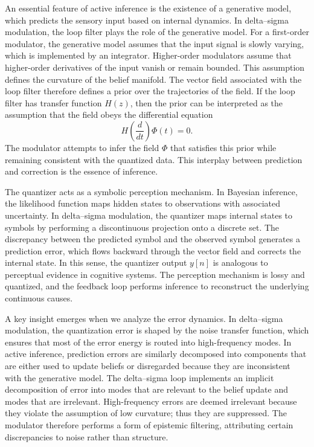 An essential feature of active inference is the existence of a generative model, which predicts the sensory input based on internal dynamics. In delta–sigma modulation, the loop filter plays the role of the generative model. For a first-order modulator, the generative model assumes that the input signal is slowly varying, which is implemented by an integrator. Higher-order modulators assume that higher-order derivatives of the input vanish or remain bounded. This assumption defines the curvature of the belief manifold. The vector field associated with the loop filter therefore defines a prior over the trajectories of the field. If the loop filter has transfer function \(H(z)\), then the prior can be interpreted as the assumption that the field obeys the differential equation
\[
H\left(\frac{d}{dt}\right)\Phi(t) = 0.
\]
The modulator attempts to infer the field \(\Phi\) that satisfies this prior while remaining consistent with the quantized data. This interplay between prediction and correction is the essence of inference.

The quantizer acts as a symbolic perception mechanism. In Bayesian inference, the likelihood function maps hidden states to observations with associated uncertainty. In delta–sigma modulation, the quantizer maps internal states to symbols by performing a discontinuous projection onto a discrete set. The discrepancy between the predicted symbol and the observed symbol generates a prediction error, which flows backward through the vector field and corrects the internal state. In this sense, the quantizer output \(y[n]\) is analogous to perceptual evidence in cognitive systems. The perception mechanism is lossy and quantized, and the feedback loop performs inference to reconstruct the underlying continuous causes.

A key insight emerges when we analyze the error dynamics. In delta–sigma modulation, the quantization error is shaped by the noise transfer function, which ensures that most of the error energy is routed into high-frequency modes. In active inference, prediction errors are similarly decomposed into components that are either used to update beliefs or disregarded because they are inconsistent with the generative model. The delta–sigma loop implements an implicit decomposition of error into modes that are relevant to the belief update and modes that are irrelevant. High-frequency errors are deemed irrelevant because they violate the assumption of low curvature; thus they are suppressed. The modulator therefore performs a form of epistemic filtering, attributing certain discrepancies to noise rather than structure.

